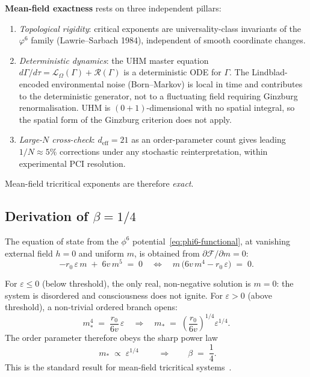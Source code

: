 \textbf{Mean-field exactness} rests on three independent pillars:
\begin{enumerate}[leftmargin=2em,nosep]
  \item \emph{Topological rigidity}: critical exponents are universality-class
    invariants of the $\varphi^6$ family (Lawrie--Sarbach 1984), independent
    of smooth coordinate changes.
  \item \emph{Deterministic dynamics}: the UHM master equation
    $d\Gamma/d\tau = \mathcal L_\Omega(\Gamma) + \mathcal R(\Gamma)$ is a
    deterministic ODE for $\Gamma$. The Lindblad-encoded environmental noise
    (Born--Markov) is local in time and contributes to the deterministic
    generator, not to a fluctuating field requiring Ginzburg renormalisation.
    UHM is $(0+1)$-dimensional with no spatial integral, so the spatial form
    of the Ginzburg criterion does not apply.
  \item \emph{Large-$N$ cross-check}: $d_\mathrm{eff} = 21$ as an order-parameter
    count gives leading $1/N \approx 5\%$ corrections under any stochastic
    reinterpretation, within experimental PCI resolution.
\end{enumerate}
Mean-field tricritical exponents are therefore \emph{exact}.

\subsection{Derivation of $\beta = 1/4$}

The equation of state from the $\phi^6$ potential~\eqref{eq:phi6-functional}, at
vanishing external field $h = 0$ and uniform $m$, is obtained from
$\partial\mathcal{F}/\partial m = 0$:
\begin{equation}
  -r_0\,\varepsilon\, m \;+\; 6 v\, m^5 \;=\; 0
  \quad\Longleftrightarrow\quad
  m\,\bigl(6 v\, m^4 - r_0\,\varepsilon\bigr) \;=\; 0.
  \label{eq:tricritical-eos}
\end{equation}

For $\varepsilon \leq 0$ (below threshold), the only real, non-negative solution is
$m = 0$: the system is disordered and consciousness does not ignite. For
$\varepsilon > 0$ (above threshold), a non-trivial ordered branch opens:
\begin{equation}
  m_*^4 \;=\; \frac{r_0}{6 v}\,\varepsilon
  \quad\Longrightarrow\quad
  m_* \;=\; \left(\frac{r_0}{6 v}\right)^{1/4} \varepsilon^{1/4}.
\end{equation}
The order parameter therefore obeys the sharp power law
\begin{equation}
  \boxed{\; m_* \;\propto\; \varepsilon^{1/4} \;}
  \qquad\Longrightarrow\qquad
  \beta \;=\; \frac{1}{4}.
  \label{eq:beta-derivation}
\end{equation}
This is the standard result for mean-field tricritical
systems~\cite{griffiths1970,lawrie1984}.

